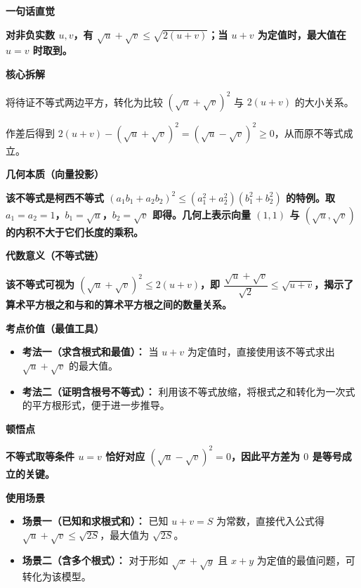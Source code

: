 \begin{explanationbox}
	\textbf{\textcolor{CExplanation}{一句话直觉}}

	\textbf{对非负实数 $u,v$，有 $\sqrt{u}+\sqrt{v}\le \sqrt{2(u+v)}$；当 $u+v$ 为定值时，最大值在 $u=v$ 时取到。}

	\medskip
	\textbf{\textcolor{CExplanation}{核心拆解}}

	\begin{description}[style=nextline, leftmargin=2.8em, labelsep=0.5em, itemsep=0.45em]
		\item[\textbf{要点一（平方转化）：}]
		      将待证不等式两边平方，转化为比较 $(\sqrt{u}+\sqrt{v})^2$ 与 $2(u+v)$ 的大小关系。

		\item[\textbf{要点二（完全平方）：}]
		      作差后得到 $2(u+v) - (\sqrt{u}+\sqrt{v})^2 = (\sqrt{u} - \sqrt{v})^2 \ge 0$，从而原不等式成立。
	\end{description}

	\medskip
	\textbf{\textcolor{CExplanation}{几何本质（向量投影）}}

	\textbf{该不等式是柯西不等式 $(a_1b_1 + a_2b_2)^2 \le (a_1^2+a_2^2)(b_1^2+b_2^2)$ 的特例。取 $a_1=a_2=1$，$b_1=\sqrt{u}$，$b_2=\sqrt{v}$ 即得。几何上表示向量 $(1,1)$ 与 $(\sqrt{u},\sqrt{v})$ 的内积不大于它们长度的乘积。}

	\medskip
	\textbf{\textcolor{CExplanation}{代数意义（不等式链）}}

	\textbf{该不等式可视为 $(\sqrt{u}+\sqrt{v})^2 \le 2(u+v)$，即 $\dfrac{\sqrt{u}+\sqrt{v}}{\sqrt{2}} \le \sqrt{u+v}$，揭示了算术平方根之和与和的算术平方根之间的数量关系。}

	\medskip
	\textbf{\textcolor{CExplanation}{考点价值（最值工具）}}

	\begin{itemize}[leftmargin=*, itemsep=0.5em, topsep=0.4em]
		\item \textbf{考法一（求含根式和最值）：} 当 $u+v$ 为定值时，直接使用该不等式求出 $\sqrt{u}+\sqrt{v}$ 的最大值。
		\item \textbf{考法二（证明含根号不等式）：} 利用该不等式放缩，将根式之和转化为一次式的平方根形式，便于进一步推导。
	\end{itemize}

	\medskip
	\textbf{\textcolor{CExplanation}{顿悟点}}

	\textbf{不等式取等条件 $u=v$ 恰好对应 $(\sqrt{u}-\sqrt{v})^2=0$，因此平方差为 $0$ 是等号成立的关键。}

	\medskip
	\textbf{\textcolor{CExplanation}{使用场景}}

	\begin{itemize}[leftmargin=*, itemsep=0.5em, topsep=0.4em]
		\item \textbf{场景一（已知和求根式和）：} 已知 $u+v=S$ 为常数，直接代入公式得 $\sqrt{u}+\sqrt{v}\le\sqrt{2S}$，最大值为 $\sqrt{2S}$。
		\item \textbf{场景二（含多个根式）：} 对于形如 $\sqrt{x}+\sqrt{y}$ 且 $x+y$ 为定值的最值问题，可转化为该模型。
	\end{itemize}
\end{explanationbox}